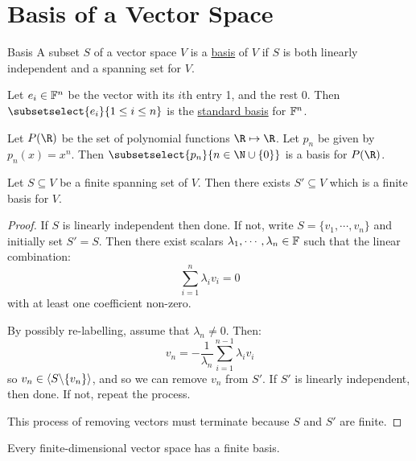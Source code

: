 \documentclass[../Main.tex]{subfiles}
\begin{document}
\section{Basis of a Vector Space}
\begin{definition}{Basis}
    A subset $S$ of a vector space $V$ is a \underline{basis} of $V$ if $S$ is both linearly independent and a spanning set for $V$.
\end{definition}
\begin{examples}{}
    \item Let $e_i \in \mathbb{F}^n$ be the vector with its $i$th entry 1, and the rest $0$. Then $\subsetselect{e_i}{1 \leq i \leq n}$ is the \underline{standard basis} for $\mathbb{F}^n$.
    \item Let $P(\R)$ be the set of polynomial functions $\R \mapsto \R$. Let $p_n$ be given by $p_n(x) = x^n$. Then $\subsetselect{p_n}{n \in \N \cup \{0\}}$ is a basis for $P(\R)$.
\end{examples}
\begin{proposition}
    Let $S \subseteq V$ be a finite spanning set of $V$. Then there exists $S' \subseteq V$ which is a finite basis for $V$.
    \label{propFinDimByBasis}
\end{proposition}
\begin{proof}
    If $S$ is linearly independent then done. If not, write $S = \{v_1, \cdots, v_n\}$ and initially set $S' = S$. Then there exist scalars $\lambda_1, \cdots, \lambda_n \in \mathbb{F}$ such that the linear combination:
    \begin{equation*}
        \sum_{i = 1}^n \lambda_i v_i = 0
    \end{equation*}
    with at least one coefficient non-zero.

    By possibly re-labelling, assume that $\lambda_n \neq 0$. Then:
    \begin{equation*}
        v_n = -\frac{1}{\lambda_n} \sum_{i = 1}^{n - 1} \lambda_i v_i
    \end{equation*}
    so $v_n \in \left\langle S \backslash \{v_n\} \right\rangle$, and so we can remove $v_n$ from $S'$. If $S'$ is linearly independent, then done. If not, repeat the process.

    This process of removing vectors must terminate because $S$ and $S'$ are finite.
\end{proof}
\begin{corollary}
    Every finite-dimensional vector space has a finite basis.
    \label{corFinDimByBasis}
\end{corollary}
\end{document}

